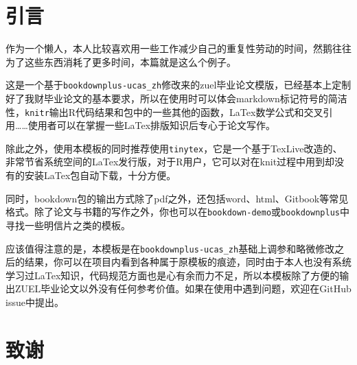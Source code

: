\documentclass[singlesided]{Style/ucasthesis}%
\begin{document}
%



{%
\linespread{1.2}%
\tableofcontents%
\listoffigures%
\listoftables%
}

\setcounter{page}{1}
\mainmatter%
\mainmatter

\hypertarget{introduction}{%
\chapter{引言}\label{introduction}}

作为一个懒人，本人比较喜欢用一些工作减少自己的重复性劳动的时间，然鹅往往为了这些东西消耗了更多时间，本篇就是这么个例子。

这是一个基于\texttt{bookdownplus-ucas\_zh}修改来的zuel毕业论文模版，已经基本上定制好了我财毕业论文的基本要求，所以在使用时可以体会markdown标记符号的简洁性，\texttt{knitr}输出R代码结果和包中的一些其他的函数，LaTex数学公式和交叉引用\ldots{}\ldots{}使用者可以在掌握一些LaTex排版知识后专心于论文写作。

除此之外，使用本模板的同时推荐使用\texttt{tinytex}，它是一个基于TexLive改造的、非常节省系统空间的LaTex发行版，对于R用户，它可以对在knit过程中用到却没有的安装LaTex包自动下载，十分方便。

同时，bookdown包的输出方式除了pdf之外，还包括word、html、Gitbook等常见格式。除了论文与书籍的写作之外，你也可以在\texttt{bookdown-demo}或\texttt{bookdownplus}中寻找一些明信片之类的模板。

应该值得注意的是，本模板是在\texttt{bookdownplus-ucas\_zh}基础上调参和略微修改之后的结果，你可以在项目内看到各种属于原模板的痕迹，同时由于本人也没有系统学习过LaTex知识，代码规范方面也是心有余而力不足，所以本模板除了方便的输出ZUEL毕业论文以外没有任何参考价值。如果在使用中遇到问题，欢迎在GitHub issue中提出。

\hypertarget{acknowlage}{%
\chapter{致谢}\label{acknowlage}}
\end{document}
